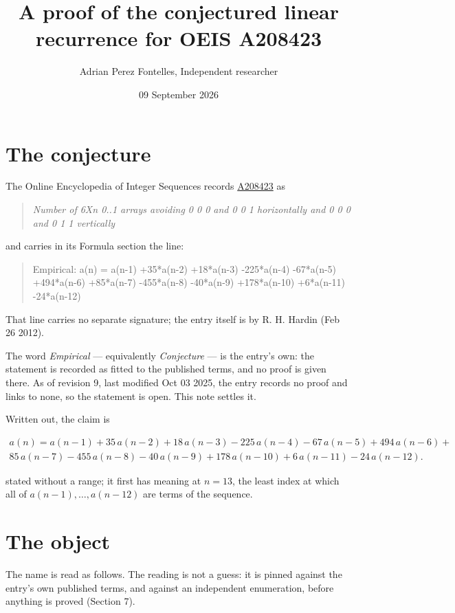 \documentclass[11pt]{article}
\title{A proof of the conjectured linear recurrence for OEIS A208423}
\author{Adrian Perez Fontelles, Independent researcher}
\date{09 September 2026}
\theoremstyle{definition}
\begin{document}
\maketitle
\section{The conjecture}

The Online Encyclopedia of Integer Sequences records \href{https://oeis.org/A208423}{A208423} as

\begin{quote}\itshape Number of 6Xn 0..1 arrays avoiding 0 0 0 and 0 0 1 horizontally and 0 0 0 and 0 1 1 vertically\end{quote}

and carries in its Formula section the line:

\begin{quote}\ttfamily Empirical: a(n) = a(n-1) +35*a(n-2) +18*a(n-3) -225*a(n-4) -67*a(n-5) +494*a(n-6) +85*a(n-7) -455*a(n-8) -40*a(n-9) +178*a(n-10) +6*a(n-11) -24*a(n-12)\end{quote}

That line carries no separate signature; the entry itself is by R. H. Hardin (Feb 26 2012).

The word {\itshape Empirical} --- equivalently {\itshape Conjecture} --- is the entry's own: the statement is recorded as fitted to the published terms, and no proof is given there. As of revision 9, last modified Oct 03 2025, the entry records no proof and links to none, so the statement is open. This note settles it.

Written out, the claim is

\begin{multline*} a(n) = a(n-1) + 35\,a(n-2) + 18\,a(n-3) - 225\,a(n-4) - 67\,a(n-5) + 494\,a(n-6) + \\ 85\,a(n-7) - 455\,a(n-8) - 40\,a(n-9) + 178\,a(n-10) + 6\,a(n-11) - 24\,a(n-12). \end{multline*}

stated without a range; it first has meaning at $n = 13$, the least index at which all of $a(n-1),\dots,a(n-12)$ are terms of the sequence.

\section{The object}

The name is read as follows. The reading is not a guess: it is pinned against the entry's own published terms, and against an independent enumeration, before anything is proved (Section 7).
\end{document}
